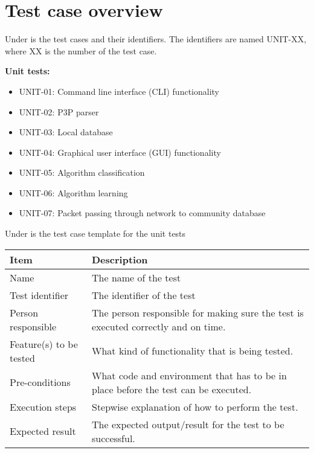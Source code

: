 \documentclass[12pt, fullpage, oneside]{report}
\begin{document}
	\section{Test case overview}
		Under is the test cases and their identifiers. The identifiers are named UNIT-XX, where XX is the number of the test case. 
		\vspace{8 mm}
		
		\textbf{Unit tests:}
		\begin{itemize}
			\renewcommand{\labelitemi}{$\bullet$}
				\item UNIT-01: Command line interface (CLI) functionality
				\item UNIT-02: P3P parser
				\item UNIT-03: Local database
				\item UNIT-04: Graphical user interface (GUI) functionality
				\item UNIT-05: Algorithm classification
				\item UNIT-06: Algorithm learning
				\item UNIT-07: Packet passing through network to community database
		\end{itemize}

		\vspace{8 mm}
		Under is the test case template for the unit tests
		\vspace{8 mm}

		\begin{center}
			\begin{tabular}{ |  p{3.5cm} | p{10cm} | }
				\hline
				Item & Description \\ [5pt] \hline \hline
				Name & The name of the test \\  [5pt] \hline
				Test identifier & The identifier of the test \\  [5pt] \hline
				Person responsible & The person responsible for making sure the test is executed correctly and on time. \\  [5pt] \hline
				Feature(s) to be tested & What kind of functionality that is being tested. \\  [5pt] \hline
				Pre-conditions & What code and environment that has to be in place before the test can be executed. \\  [5pt] \hline
				Execution steps & Stepwise explanation of how to perform the test. \\  [5pt] \hline
				Expected result & The expected output/result for the test to be successful. \\  [5pt] \hline
			\end{tabular}
		\end{center}
\end{document}
